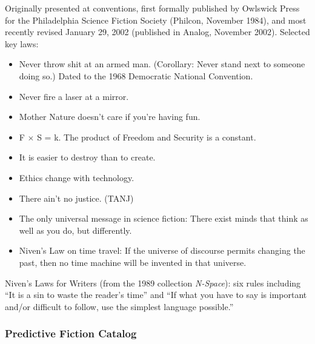 \documentclass[11pt,letterpaper]{article}
\begin{document}
Originally presented at conventions, first formally published by Owlswick Press for the Philadelphia Science Fiction Society (Philcon, November 1984), and most recently revised January 29, 2002 (published in Analog, November 2002). Selected key laws:

\begin{itemize}[leftmargin=2em]
\item Never throw shit at an armed man. (Corollary: Never stand next to someone doing so.) Dated to the 1968 Democratic National Convention.
\item Never fire a laser at a mirror.
\item Mother Nature doesn't care if you're having fun.
\item F $\times$ S = k. The product of Freedom and Security is a constant.
\item It is easier to destroy than to create.
\item Ethics change with technology.
\item There ain't no justice. (TANJ)
\item The only universal message in science fiction: There exist minds that think as well as you do, but differently.
\item Niven's Law on time travel: If the universe of discourse permits changing the past, then no time machine will be invented in that universe.
\end{itemize}

Niven's Laws for Writers (from the 1989 collection \textit{N-Space}): six rules including ``It is a sin to waste the reader's time'' and ``If what you have to say is important and/or difficult to follow, use the simplest language possible.''

\subsubsection{Predictive Fiction Catalog}
\end{document}
